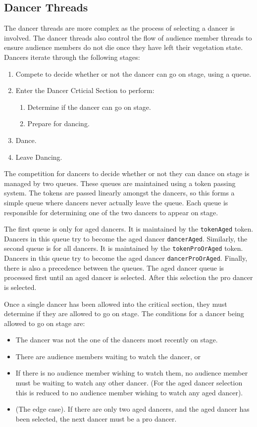 \documentclass[12pt,a4paper]{scrartcl}
\begin{document}
\subsection{Dancer Threads}
\label{sub:dancer-threads}
The dancer threads are more complex as the process of selecting a dancer is involved.
The dancer threads also control the flow of audience member threads to ensure audience members do not die once they have left their vegetation state.
Dancers iterate through the following stages:
\begin{enumerate}
    \item Compete to decide whether or not the dancer can go on stage, using a queue.
    \item Enter the Dancer Crticial Section to perform:
    \begin{enumerate}
        \item Determine if the dancer can go on stage.
        \item Prepare for dancing.
    \end{enumerate}
    \item Dance.
    \item Leave Dancing.
\end{enumerate}

The competition for dancers to decide whether or not they can dance on stage is managed by two queues.
These queues are maintained using a token passing system.
The tokens are passed linearly amongst the dancers, so this forms a simple queue where dancers never actually leave the queue.
Each queue is responsible for determining one of the two dancers to appear on stage.

The first queue is only for aged dancers.
It is maintained by the \texttt{tokenAged} token.
Dancers in this queue try to become the aged dancer \texttt{dancerAged}.
Similarly, the second queue is for all dancers.
It is maintained by the \texttt{tokenProOrAged} token.
Dancers in this queue try to become the aged dancer \texttt{dancerProOrAged}.
Finally, there is also a precedence between the queues.
The aged dancer queue is processed first until an aged dancer is selected.
After this selection the pro dancer is selected.

Once a single dancer has been allowed into the critical section, they must determine if they are allowed to go on stage.
The conditions for a dancer being allowed to go on stage are:
\begin{itemize}
    \item The dancer was not the one of the dancers most recently on stage.
    \item There are audience members waiting to watch the dancer, or
    \item If there is no audience member wishing to watch them, no audience member must be waiting to watch any other dancer.
          (For the aged dancer selection this is reduced to no audience member wishing to watch any aged dancer).
    \item (The edge case). If there are only two aged dancers, and the aged dancer has been selected, the next dancer must be a pro dancer.
\end{itemize}
\end{document}
